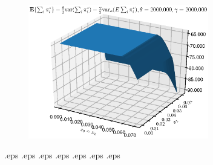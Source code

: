 \begin{figure}[htbp] %
   \centering
   \includegraphics[width=0.7\textwidth]{Figures/AToy/Atoy-FCP200000200000} 
\end{figure}

.eps
.eps
.eps
.eps
.eps
.eps
.eps